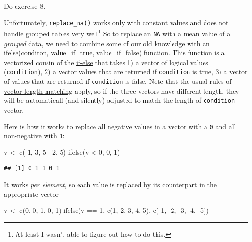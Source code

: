 \documentclass[
]{book}
\newenvironment{Shaded}{\begin{snugshade}}{\end{snugshade}}
\newcommand{\DecValTok}[1]{\textcolor[rgb]{0.00,0.00,0.81}{#1}}
\newcommand{\FunctionTok}[1]{\textcolor[rgb]{0.00,0.00,0.00}{#1}}
\newcommand{\NormalTok}[1]{#1}
\newcommand{\OtherTok}[1]{\textcolor[rgb]{0.56,0.35,0.01}{#1}}
\newcommand{\SpecialCharTok}[1]{\textcolor[rgb]{0.00,0.00,0.00}{#1}}
\begin{document}
Do exercise 8.

Unfortunately, \texttt{replace\_na()} works only with constant values and does not handle grouped tables very well\footnote{At least I wasn't able to figure out how to do this.} So to replace an \texttt{NA} with a mean value of a \emph{grouped} data, we need to combine some of our old knowledge with an \href{https://stat.ethz.ch/R-manual/R-devel/library/base/html/ifelse.html}{ifelse(conditon, value\_if\_true, value\_if\_false)} function. This function is a vectorized cousin of the \protect\hyperlink{if-else}{if-else} that takes 1) a vector of logical values (\texttt{condition}), 2) a vector values that are returned if \texttt{condition} is true, 3) a vector of values that are returned if \texttt{condition} is false. Note that the usual rules of \href{different-length-vectors}{vector length-matching} apply, so if the three vectors have different length, they will be automaticall (and silently) adjusted to match the length of \texttt{condition} vector.

Here is how it works to replace all negative values in a vector with a \texttt{0} and all non-negative with \texttt{1}:

\begin{Shaded}
\begin{Highlighting}[]
\NormalTok{v }\OtherTok{\textless{}{-}} \FunctionTok{c}\NormalTok{(}\SpecialCharTok{{-}}\DecValTok{1}\NormalTok{, }\DecValTok{3}\NormalTok{, }\DecValTok{5}\NormalTok{, }\SpecialCharTok{{-}}\DecValTok{2}\NormalTok{, }\DecValTok{5}\NormalTok{)}
\FunctionTok{ifelse}\NormalTok{(v }\SpecialCharTok{\textless{}} \DecValTok{0}\NormalTok{, }\DecValTok{0}\NormalTok{, }\DecValTok{1}\NormalTok{)}
\end{Highlighting}
\end{Shaded}

\begin{verbatim}
## [1] 0 1 1 0 1
\end{verbatim}

It works \emph{per element}, so each value is replaced by its counterpart in the appropriate vector

\begin{Shaded}
\begin{Highlighting}[]
\NormalTok{v }\OtherTok{\textless{}{-}} \FunctionTok{c}\NormalTok{(}\DecValTok{0}\NormalTok{, }\DecValTok{0}\NormalTok{, }\DecValTok{1}\NormalTok{, }\DecValTok{0}\NormalTok{, }\DecValTok{1}\NormalTok{)}
\FunctionTok{ifelse}\NormalTok{(v }\SpecialCharTok{==} \DecValTok{1}\NormalTok{,}
       \FunctionTok{c}\NormalTok{(}\DecValTok{1}\NormalTok{, }\DecValTok{2}\NormalTok{, }\DecValTok{3}\NormalTok{, }\DecValTok{4}\NormalTok{, }\DecValTok{5}\NormalTok{), }
       \FunctionTok{c}\NormalTok{(}\SpecialCharTok{{-}}\DecValTok{1}\NormalTok{, }\SpecialCharTok{{-}}\DecValTok{2}\NormalTok{, }\SpecialCharTok{{-}}\DecValTok{3}\NormalTok{, }\SpecialCharTok{{-}}\DecValTok{4}\NormalTok{, }\SpecialCharTok{{-}}\DecValTok{5}\NormalTok{))}
\end{Highlighting}
\end{Shaded}
\end{document}
